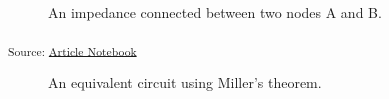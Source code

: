 \documentclass[
  a4paper,
  DIV=11,
  numbers=noendperiod]{scrartcl}
\begin{document}
\begin{figure}[H]


\caption{\label{fig-miller-theorem}An impedance connected between two
nodes A and B.}

\end{figure}%

\textsubscript{Source:
\href{https://iic-jku.github.io/analog-circuit-design/index.qmd.html}{Article
Notebook}}

\begin{figure}[H]


\caption{\label{fig-miller-theorem-equivalent}An equivalent circuit
using Miller's theorem.}

\end{figure}%
\end{document}
